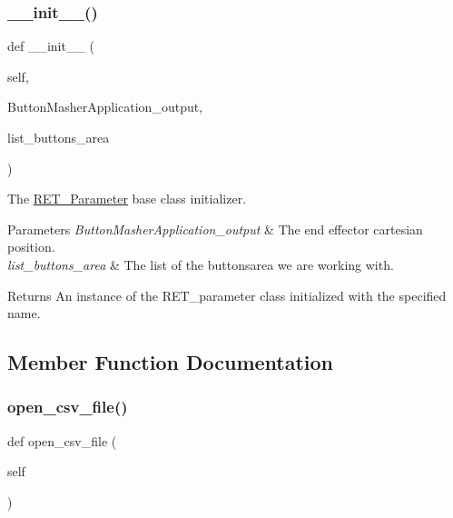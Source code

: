 \subsubsection{\texorpdfstring{\+\_\+\+\_\+init\+\_\+\+\_\+()}{\_\_init\_\_()}}
{\footnotesize\ttfamily def \+\_\+\+\_\+init\+\_\+\+\_\+ (\begin{DoxyParamCaption}\item[{}]{self,  }\item[{}]{Button\+Masher\+Application\+\_\+output,  }\item[{}]{list\+\_\+buttons\+\_\+area }\end{DoxyParamCaption})}



The \hyperlink{classRET__Parameter_1_1RET__Parameter}{R\+E\+T\+\_\+\+Parameter} base class initializer. 


\begin{DoxyParams}{Parameters}
{\em Button\+Masher\+Application\+\_\+output} & The end effector cartesian position. \\
\hline
{\em list\+\_\+buttons\+\_\+area} & The list of the buttons\textquotesingle{}area we are working with. \\
\hline
\end{DoxyParams}
\begin{DoxyReturn}{Returns}
An instance of the R\+E\+T\+\_\+parameter class initialized with the specified name. 
\end{DoxyReturn}


\subsection{Member Function Documentation}
\mbox{\label{classRET__Parameter_1_1RET__Parameter_a6b5778a011cd40b8302107493f8212c3}} 
\subsubsection{\texorpdfstring{open\+\_\+csv\+\_\+file()}{open\_csv\_file()}}
{\footnotesize\ttfamily def open\+\_\+csv\+\_\+file (\begin{DoxyParamCaption}\item[{}]{self }\end{DoxyParamCaption})}



